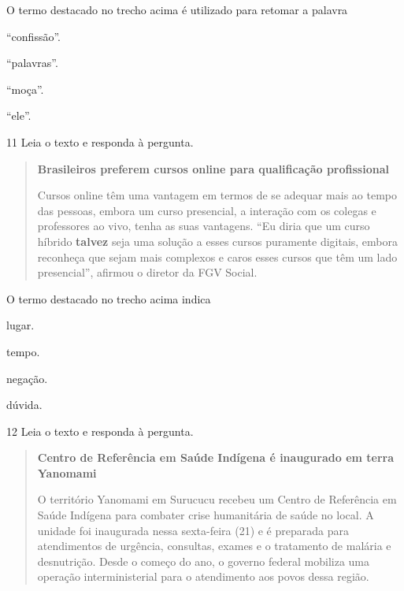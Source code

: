O termo destacado no trecho acima é utilizado para retomar a palavra

\begin{escolha}
  \item ``confissão''.

  \item ``palavras''.

  \item ``moça''.

  \item ``ele''.
\end{escolha}

\pagebreak
\num{11} Leia o texto e responda à pergunta.

\begin{quote}
\textbf{Brasileiros preferem cursos online para qualificação profissional}

Cursos online têm uma vantagem em termos de se adequar mais ao tempo das
pessoas, embora um curso presencial, a interação com os colegas e
professores ao vivo, tenha as suas vantagens. ``Eu diria que um curso
híbrido \textbf{talvez} seja uma solução a esses cursos puramente digitais,
embora reconheça que sejam mais complexos e caros esses cursos que têm
um lado presencial'', afirmou o diretor da FGV Social.

\end{quote}

O termo destacado no trecho acima indica

\begin{escolha}
  \item lugar.

  \item tempo.

  \item negação.

  \item dúvida.
\end{escolha}



\num{12} Leia o texto e responda à pergunta.

\begin{quote}
\textbf{Centro de Referência em Saúde Indígena é inaugurado em terra
Yanomami}

O território Yanomami em Surucucu recebeu um Centro de Referência em
Saúde Indígena para combater crise humanitária de saúde no local. A
unidade foi inaugurada nessa sexta-feira (21) e é preparada para
atendimentos de urgência, consultas, exames e o tratamento de malária e
desnutrição. Desde o começo do ano, o governo federal mobiliza uma
operação interministerial para o atendimento aos povos dessa região.

\end{quote}

